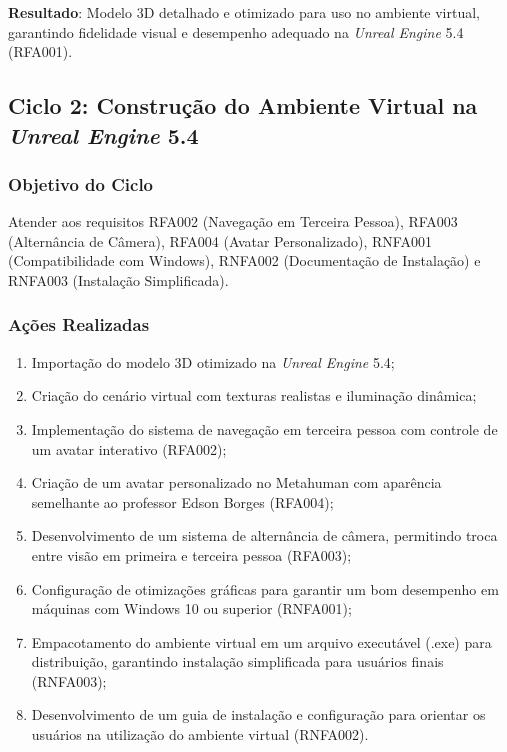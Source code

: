 \textbf{Resultado}: Modelo 3D detalhado e otimizado para uso no ambiente virtual, garantindo fidelidade visual e desempenho adequado na \textit{Unreal Engine} 5.4 (RFA001).

\subsection*{Ciclo 2: Construção do Ambiente Virtual na \textit{Unreal Engine} 5.4} \label{subsec:ciclo2}

\subsubsection*{Objetivo do Ciclo}
Atender aos requisitos RFA002 (Navegação em Terceira Pessoa), RFA003 (Alternância de Câmera), RFA004 (Avatar Personalizado), RNFA001 (Compatibilidade com Windows), RNFA002 (Documentação de Instalação) e RNFA003 (Instalação Simplificada).

\subsubsection*{Ações Realizadas}
\begin{enumerate}
    \item Importação do modelo 3D otimizado na \textit{Unreal Engine} 5.4;
    \item Criação do cenário virtual com texturas realistas e iluminação dinâmica;
    \item Implementação do sistema de navegação em terceira pessoa com controle de um avatar interativo (RFA002);
    \item Criação de um avatar personalizado no Metahuman com aparência semelhante ao professor Edson Borges (RFA004);
    \item Desenvolvimento de um sistema de alternância de câmera, permitindo troca entre visão em primeira e terceira pessoa (RFA003);
    \item Configuração de otimizações gráficas para garantir um bom desempenho em máquinas com Windows 10 ou superior (RNFA001);
    \item Empacotamento do ambiente virtual em um arquivo executável (.exe) para distribuição, garantindo instalação simplificada para usuários finais (RNFA003);
    \item Desenvolvimento de um guia de instalação e configuração para orientar os usuários na utilização do ambiente virtual (RNFA002).
\end{enumerate}

